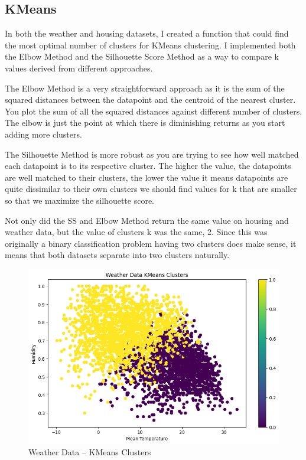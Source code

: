 \documentclass[conference]{IEEEtran}
\begin{document}
\subsection{KMeans}
In both the weather and housing datasets, I created a function that could find the most optimal number of clusters for KMeans clustering. I implemented both the Elbow Method and the Silhouette Score Method as a way to compare k values derived from different approaches. 
\par The Elbow Method is a very straightforward approach as it is the sum of the squared distances between the datapoint and the centroid of the nearest cluster. You plot the sum of all the squared distances against different number of clusters. The elbow is just the point at which there is diminishing returns as you start adding more clusters. 
\par The Silhouette Method is more robust as you are trying to see how well matched each datapoint is to its respective cluster. The higher the value, the datapoints are well matched to their clusters, the lower the value it means datapoints are quite dissimilar to their own clusters we should find values for k that are smaller so that we maximize the silhouette score. 
\par Not only did the SS and Elbow Method return the same value on housing and weather data, but the value of clusters k was the same, 2. Since this was originally a binary classification problem having two clusters does make sense, it means that both datasets separate into two clusters naturally.
\begin{figure} 
    \centering
    \includegraphics[width=1.0\linewidth]{figures//weather_figures/step_1a.png}
    \caption{Weather Data -- KMeans Clusters}
    \label{fig:1_weather_kmeans
}
\end{figure}
\end{document}
